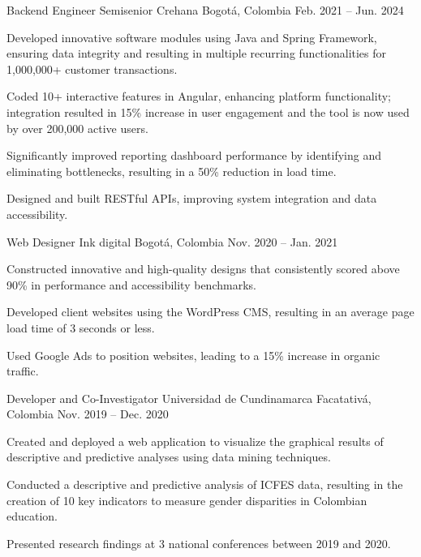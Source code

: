 \documentclass[]{awesome-cv}
\begin{document}
\begin{cventries}
	\cventry
	{Backend Engineer Semisenior}
	{Crehana}
	{Bogotá, Colombia}
	{Feb. 2021 – Jun. 2024}
	{\begin{cvitems}
		\vspace{0.2mm}
		\item {Developed innovative software modules using Java and Spring Framework, ensuring data integrity and resulting in multiple recurring functionalities for 1,000,000+ customer transactions.}
		\item {Coded 10+ interactive features in Angular, enhancing platform functionality; integration resulted in 15\% increase in user engagement and the tool is now used by over 200,000 active users.}
		\item {Significantly improved reporting dashboard performance by identifying and eliminating bottlenecks, resulting in a 50\% reduction in load time.}
		\item {Designed and built RESTful APIs, improving system integration and data accessibility.}
		\end{cvitems}}

	\cventry
	{Web Designer}
	{Ink digital}
	{Bogotá, Colombia}
	{Nov. 2020 – Jan. 2021}
	{\begin{cvitems}
		\vspace{0.2mm}
		\item {Constructed innovative and high-quality designs that consistently scored above 90\% in performance and accessibility benchmarks.}
		\item {Developed client websites using the WordPress CMS, resulting in an average page load time of 3 seconds or less.}
		\item {Used Google Ads to position websites, leading to a 15\% increase in organic traffic.}
		\end{cvitems}}

	\cventry
	{Developer and Co-Investigator}
	{Universidad de Cundinamarca}
	{Facatativá, Colombia}
	{Nov. 2019 – Dec. 2020}
	{\begin{cvitems}
		\vspace{0.2mm}
		\item {Created and deployed a web application to visualize the graphical results of descriptive and predictive analyses using data mining techniques.}
		\item {Conducted a descriptive and predictive analysis of ICFES data, resulting in the creation of 10 key indicators to measure gender disparities in Colombian education.}
		\item {Presented research findings at 3 national conferences between 2019 and 2020.}
		\end{cvitems}}
\end{cventries}
\end{document}
